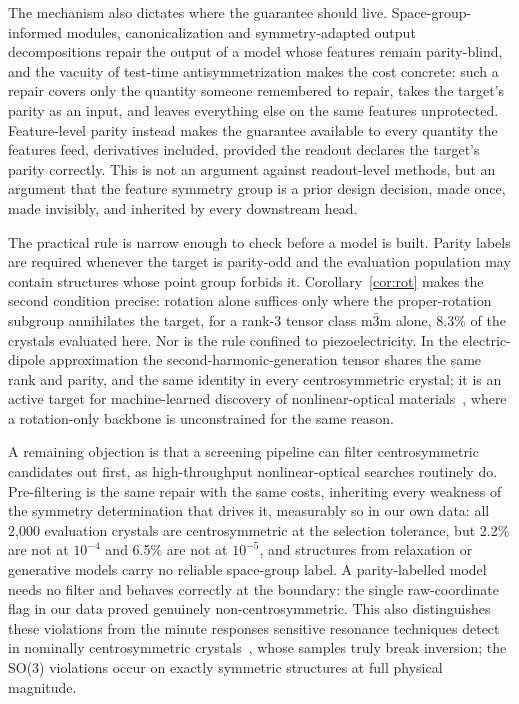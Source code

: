 The mechanism also dictates where the guarantee should live. Space-group-informed modules, canonicalization and symmetry-adapted output decompositions repair the output of a model whose features remain parity-blind, and the vacuity of test-time antisymmetrization makes the cost concrete: such a repair covers only the quantity someone remembered to repair, takes the target's parity as an input, and leaves everything else on the same features unprotected. Feature-level parity instead makes the guarantee available to every quantity the features feed, derivatives included, provided the readout declares the target's parity correctly. This is not an argument against readout-level methods, but an argument that the feature symmetry group is a prior design decision, made once, made invisibly, and inherited by every downstream head.

The practical rule is narrow enough to check before a model is built. Parity labels are required whenever the target is parity-odd and the evaluation population may contain structures whose point group forbids it. Corollary~\ref{cor:rot} makes the second condition precise: rotation alone suffices only where the proper-rotation subgroup annihilates the target, for a rank-3 tensor class m$\bar 3$m alone, 8.3\% of the crystals evaluated here. Nor is the rule confined to piezoelectricity. In the electric-dipole approximation the second-harmonic-generation tensor shares the same rank and parity, and the same identity in every centrosymmetric crystal; it is an active target for machine-learned discovery of nonlinear-optical materials~\cite{optixnet2026}, where a rotation-only backbone is unconstrained for the same reason.

A remaining objection is that a screening pipeline can filter centrosymmetric candidates out first, as high-throughput nonlinear-optical searches routinely do. Pre-filtering is the same repair with the same costs, inheriting every weakness of the symmetry determination that drives it, measurably so in our own data: all 2,000 evaluation crystals are centrosymmetric at the selection tolerance, but 2.2\% are not at $10^{-4}$ and 6.5\% are not at $10^{-5}$, and structures from relaxation or generative models carry no reliable space-group label. A parity-labelled model needs no filter and behaves correctly at the boundary: the single raw-coordinate flag in our data proved genuinely non-centrosymmetric. This also distinguishes these violations from the minute responses sensitive resonance techniques detect in nominally centrosymmetric crystals~\cite{aktas2021nominally}, whose samples truly break inversion; the SO(3) violations occur on exactly symmetric structures at full physical magnitude.

